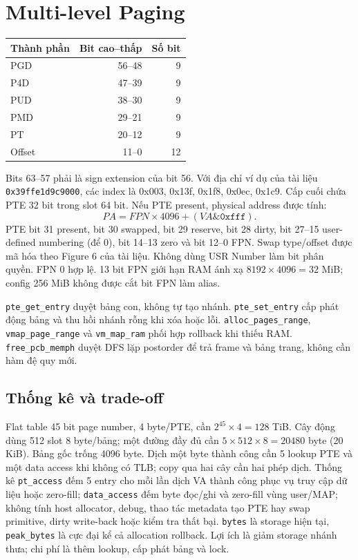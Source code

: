 \documentclass[11pt,a4paper]{article}
\begin{document}
\section{Multi-level Paging}
\begin{center}
\begin{tabular}{lrr}\toprule
Thành phần & Bit cao--thấp & Số bit\\\midrule
PGD & 56--48 & 9\\
P4D & 47--39 & 9\\
PUD & 38--30 & 9\\
PMD & 29--21 & 9\\
PT & 20--12 & 9\\
Offset & 11--0 & 12\\\bottomrule
\end{tabular}
\end{center}
Bits 63--57 phải là sign extension của bit 56. Với địa chỉ ví dụ của tài liệu \texttt{0x39ffe1d9c9000}, các index là 0x003, 0x13f, 0x1f8, 0x0ec, 0x1c9. Cấp cuối chứa PTE 32 bit trong slot 64 bit. Nếu PTE present, physical address được tính:
\[ PA = FPN \times 4096 + (VA\mathbin{\&}\texttt{0xfff}). \]
PTE bit 31 present, bit 30 swapped, bit 29 reserve, bit 28 dirty, bit 27--15 user-defined numbering (để 0), bit 14--13 zero và bit 12--0 FPN. Swap type/offset được mã hóa theo Figure 6 của tài liệu. Không dùng USR Number làm bit phân quyền. FPN 0 hợp lệ. 13 bit FPN giới hạn RAM ánh xạ $8192\times4096=32$ MiB; config 256 MiB không được cắt bit FPN làm alias.

\texttt{pte\_get\_entry} duyệt bảng con, không tự tạo nhánh. \texttt{pte\_set\_entry} cấp phát động bảng và thu hồi nhánh rỗng khi xóa hoặc lỗi. \texttt{alloc\_pages\_range}, \texttt{vmap\_page\_range} và \texttt{vm\_map\_ram} phối hợp rollback khi thiếu RAM. \texttt{free\_pcb\_memph} duyệt DFS lặp postorder để trả frame và bảng trang, không cần hàm đệ quy mới.
\subsection{Thống kê và trade-off}
Flat table 45 bit page number, 4 byte/PTE, cần $2^{45}\times4=128$ TiB. Cây động dùng 512 slot 8 byte/bảng; một đường đầy đủ cần $5\times512\times8=20480$ byte (20 KiB). Bảng gốc trống 4096 byte. Dịch một byte thành công cần 5 lookup PTE và một data access khi không có TLB; copy qua hai cây cần hai phép dịch. Thống kê \texttt{pt\_access} đếm 5 entry cho mỗi lần dịch VA thành công phục vụ truy cập dữ liệu hoặc zero-fill; \texttt{data\_access} đếm byte đọc/ghi và zero-fill vùng user/MAP; không tính host allocator, debug, thao tác metadata tạo PTE hay swap primitive, dirty write-back hoặc kiểm tra thất bại. \texttt{bytes} là storage hiện tại, \texttt{peak\_bytes} là cực đại kể cả allocation rollback. Lợi ích là giảm storage nhánh thưa; chi phí là thêm lookup, cấp phát bảng và lock.
\end{document}
